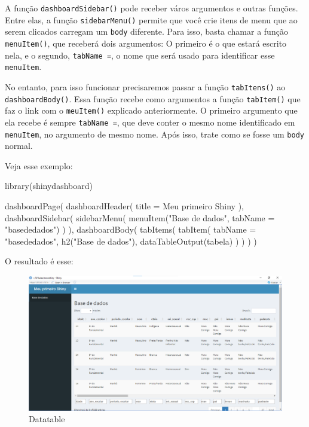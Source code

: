 \documentclass[
]{book}
\newenvironment{Shaded}{\begin{snugshade}}{\end{snugshade}}
\newcommand{\AttributeTok}[1]{\textcolor[rgb]{0.77,0.63,0.00}{#1}}
\newcommand{\FunctionTok}[1]{\textcolor[rgb]{0.00,0.00,0.00}{#1}}
\newcommand{\NormalTok}[1]{#1}
\newcommand{\StringTok}[1]{\textcolor[rgb]{0.31,0.60,0.02}{#1}}
\begin{document}
A função \texttt{dashboardSidebar()} pode receber város argumentos e outras funções. Entre elas, a função \texttt{sidebarMenu()} permite que você crie itens de menu que ao serem clicados carregam um \texttt{body} diferente. Para isso, basta chamar a função \texttt{menuItem()}, que receberá dois argumentos: O primeiro é o que estará escrito nela, e o segundo, \texttt{tabName\ =}, o nome que será usado para identificar esse \texttt{menuItem}.

No entanto, para isso funcionar precisaremos passar a função \texttt{tabItens()} ao \texttt{dashboardBody()}. Essa função recebe como argumentos a função \texttt{tabItem()} que faz o link com o \texttt{meuItem()} explicado anteriormente. O primeiro argumento que ela recebe é sempre \texttt{tabName\ =}, que deve conter o mesmo nome identificado em \texttt{menuItem}, no argumento de mesmo nome. Após isso, trate como se fosse um \texttt{body} normal.

Veja esse exemplo:

\begin{Shaded}
\begin{Highlighting}[]
\FunctionTok{library}\NormalTok{(shinydashboard)}

\FunctionTok{dashboardPage}\NormalTok{(}
  \FunctionTok{dashboardHeader}\NormalTok{(}
    \AttributeTok{title =} \StringTok{\textquotesingle{}Meu primeiro Shiny\textquotesingle{}}
\NormalTok{  ),}
  \FunctionTok{dashboardSidebar}\NormalTok{(}
    \FunctionTok{sidebarMenu}\NormalTok{(}
      \FunctionTok{menuItem}\NormalTok{(}\StringTok{"Base de dados"}\NormalTok{, }\AttributeTok{tabName =} \StringTok{"basededados"}\NormalTok{)}
\NormalTok{    )}
\NormalTok{  ),}
  \FunctionTok{dashboardBody}\NormalTok{(}
    \FunctionTok{tabItems}\NormalTok{(}
      \FunctionTok{tabItem}\NormalTok{(}
        \AttributeTok{tabName =} \StringTok{"basededados"}\NormalTok{,}
        \FunctionTok{h2}\NormalTok{(}\StringTok{"Base de dados"}\NormalTok{),}
        \FunctionTok{dataTableOutput}\NormalTok{(}\StringTok{\textquotesingle{}tabela\textquotesingle{}}\NormalTok{)}
\NormalTok{      )}
\NormalTok{    )}
\NormalTok{  )}
\NormalTok{)}
\end{Highlighting}
\end{Shaded}

O resultado é esse:

\begin{figure}
\centering
\includegraphics{./imagens/cap10imagem13.png}
\caption{Datatable}
\end{figure}
\end{document}
